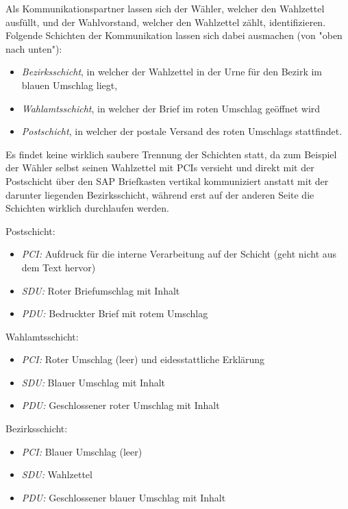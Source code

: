 \documentclass{../exercisesheet}
\begin{document}
\begin{exercise}{3}
	\begin{subexercise}
		Als Kommunikationspartner lassen sich der Wähler, welcher den Wahlzettel ausfüllt, und der Wahlvorstand, welcher den Wahlzettel zählt, identifizieren. Folgende
		Schichten der Kommunikation lassen sich dabei ausmachen (von "oben nach unten"):
		\begin{itemize}
		\item \textit{Bezirksschicht}, in welcher der Wahlzettel in der Urne für den Bezirk im blauen Umschlag liegt,
		\item \textit{Wahlamtsschicht}, in welcher der Brief im roten Umschlag geöffnet wird
		\item \textit{Postschicht}, in welcher der postale Versand des roten Umschlags stattfindet.
		\end{itemize}
		Es findet keine wirklich saubere Trennung der Schichten statt, da zum Beispiel der Wähler selbst seinen Wahlzettel mit PCIs versieht und direkt mit der Postschicht über
		den SAP Briefkasten vertikal kommuniziert anstatt mit der darunter liegenden Bezirksschicht, während erst auf der anderen Seite die Schichten wirklich durchlaufen werden.
	\end{subexercise}

	\begin{subexercise}
		Postschicht:
		\begin{itemize}
		\item \textit{PCI:} Aufdruck für die interne Verarbeitung auf der Schicht (geht nicht aus dem Text hervor)
		\item \textit{SDU:} Roter Briefumschlag mit Inhalt
		\item \textit{PDU:} Bedruckter Brief mit rotem Umschlag
		\end{itemize}
		Wahlamtsschicht:
		\begin{itemize}
		\item \textit{PCI:} Roter Umschlag (leer) und eidesstattliche Erklärung
		\item \textit{SDU:} Blauer Umschlag mit Inhalt
		\item \textit{PDU:} Geschlossener roter Umschlag mit Inhalt
		\end{itemize}
		Bezirksschicht:
		\begin{itemize}
		\item \textit{PCI:} Blauer Umschlag (leer)
		\item \textit{SDU:} Wahlzettel
		\item \textit{PDU:} Geschlossener blauer Umschlag mit Inhalt
		\end{itemize}
	\end{subexercise}
\end{exercise}
\end{document}
